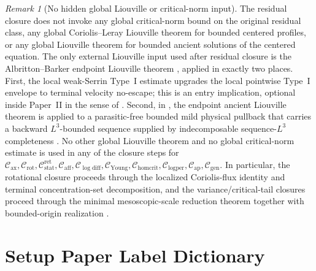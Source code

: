 \documentclass[11pt]{amsart}
\numberwithin{equation}{section}
\theoremstyle{plain}
\theoremstyle{definition}
\theoremstyle{remark}
\newtheorem{remark}[remark]{Remark}
\newcommand{\Cax}{\mathcal C_{\mathrm{ax}}}
\newcommand{\Crot}{\mathcal C_{\mathrm{rot}}}
\newcommand{\Cstat}{\mathcal C_{\mathrm{stat}}^{\mathrm{ret}}}
\newcommand{\Caff}{\mathcal C_{\mathrm{aff}}}
\newcommand{\Cgen}{\mathcal C_{\mathrm{gen}}}
\newcommand{\Chomcrit}{\mathcal C_{\mathrm{homcrit}}}
\newcommand{\Clogper}{\mathcal C_{\mathrm{logper}}}
\newcommand{\Capcrit}{\mathcal C_{\mathrm{ap}}}
\newcommand{\Cyoung}{\mathcal C_{\mathrm{Young}}}
\newcommand{\Clogdiff}{\mathcal C_{\log\mathrm{diff}}}
\begin{document}
\begin{remark}[No hidden global Liouville or critical-norm input]
\label{rem:no-hidden-global-liouville}
The residual closure does not invoke any global critical-norm bound on the
original residual class, any global Coriolis--Leray Liouville theorem for
bounded centered profiles, or any global Liouville theorem for bounded ancient
solutions of the centered equation.  The only external Liouville input used
after residual closure is the Albritton--Barker endpoint Liouville theorem
, applied in exactly two places.  First, the local
weak-Serrin Type~I estimate
upgrades the local pointwise Type~I envelope to terminal velocity
no-escape; this is an entry implication, optional inside Paper~II in the sense
of .  Second, in
, the endpoint ancient Liouville theorem is applied
to a parasitic-free bounded mild physical pullback that carries a backward
\(L^3\)-bounded sequence supplied by indecomposable sequence-\(L^3\)
completeness .  No other global Liouville
theorem and no global critical-norm estimate is used in any of the closure
steps for \(\Cax,\Crot,\Cstat,\Caff,\Clogdiff,\Cyoung,\Chomcrit,\Clogper,
\Capcrit,\Cgen\).  In particular, the rotational closure
 proceeds through the localized Coriolis-flux
identity and terminal concentration-set decomposition, and the variance/critical-tail
closures proceed through the minimal mesoscopic-scale reduction theorem
 together with bounded-origin
realization .
\end{remark}

\appendix

\section{Setup Paper Label Dictionary}
\label{app:setup-label-dictionary}
\end{document}
